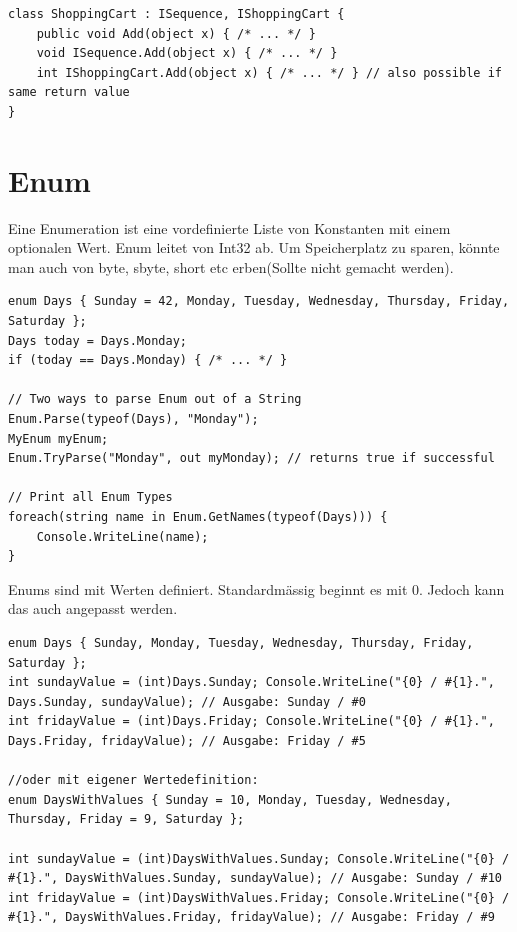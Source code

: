 \documentclass[
a4paper,
oneside,
10pt,
fleqn,
headsepline,
toc=listofnumbered, 
bibliography=totocnumbered]{scrartcl}
\let\stdsection\section
\renewcommand\section{\clearpage\stdsection}
\begin{document}
\begin{lstlisting}
class ShoppingCart : ISequence, IShoppingCart {
    public void Add(object x) { /* ... */ } 
    void ISequence.Add(object x) { /* ... */ } 
    int IShoppingCart.Add(object x) { /* ... */ } // also possible if same return value 
}
\end{lstlisting}

\section{Enum}
Eine Enumeration ist eine vordefinierte Liste von Konstanten mit einem optionalen Wert. Enum leitet von Int32 ab. Um Speicherplatz zu sparen, könnte man auch von byte, sbyte, short etc erben(Sollte nicht gemacht werden).
\begin{lstlisting}
enum Days { Sunday = 42, Monday, Tuesday, Wednesday, Thursday, Friday, Saturday };
Days today = Days.Monday;
if (today == Days.Monday) { /* ... */ }

// Two ways to parse Enum out of a String
Enum.Parse(typeof(Days), "Monday");
MyEnum myEnum;
Enum.TryParse("Monday", out myMonday); // returns true if successful

// Print all Enum Types
foreach(string name in Enum.GetNames(typeof(Days))) {
	Console.WriteLine(name);
}
\end{lstlisting}
Enums sind mit Werten definiert. Standardmässig beginnt es mit 0. Jedoch kann das auch angepasst werden.

\begin{lstlisting}
enum Days { Sunday, Monday, Tuesday, Wednesday, Thursday, Friday, Saturday };
int sundayValue = (int)Days.Sunday; Console.WriteLine("{0} / #{1}.", Days.Sunday, sundayValue); // Ausgabe: Sunday / #0
int fridayValue = (int)Days.Friday; Console.WriteLine("{0} / #{1}.", Days.Friday, fridayValue); // Ausgabe: Friday / #5 

//oder mit eigener Wertedefinition:
enum DaysWithValues { Sunday = 10, Monday, Tuesday, Wednesday, Thursday, Friday = 9, Saturday }; 

int sundayValue = (int)DaysWithValues.Sunday; Console.WriteLine("{0} / #{1}.", DaysWithValues.Sunday, sundayValue); // Ausgabe: Sunday / #10
int fridayValue = (int)DaysWithValues.Friday; Console.WriteLine("{0} / #{1}.", DaysWithValues.Friday, fridayValue); // Ausgabe: Friday / #9 
\end{lstlisting}
\end{document}
